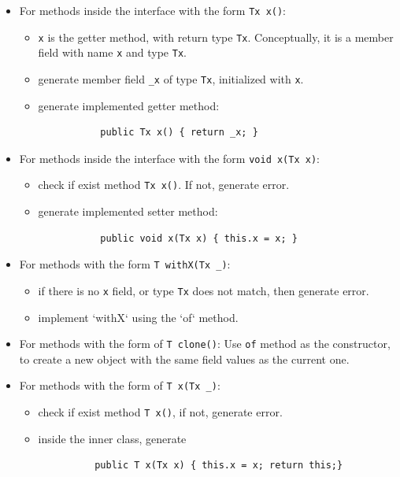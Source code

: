 \begin{itemize}
\item For methods inside the interface with the form \texttt{Tx x()}:
  \begin{itemize}
   \item \texttt{x} is the getter method, with return type
     \texttt{Tx}. Conceptually, it is a member field with name \texttt{x} and
     type \texttt{Tx}.
   \item generate member field \texttt{\_x} of type \texttt{Tx}, initialized
     with \texttt{x}.
   \item generate implemented getter method:
       \begin{lstlisting}
           public Tx x() { return _x; }
       \end{lstlisting}
   \end{itemize}

\item For methods inside the interface with the form \texttt{void x(Tx x)}:
  \begin{itemize}
    \item check if exist method \texttt{Tx x()}. If not, generate error.
    \item generate implemented setter method:
       \begin{lstlisting}
           public void x(Tx x) { this.x = x; }
       \end{lstlisting}
    \end{itemize}

\item For methods with the form \texttt{T withX(Tx \_)}:
  \begin{itemize}
  \item if there is no \texttt{x} field, or type \texttt{Tx} does not match,
    then generate error.
  \item implement `withX` using the `of` method.
  \end{itemize}

\item For methods with the form of \texttt{T clone()}: Use \texttt{of} method as
  the constructor, to create a new object with the same field values as the
  current one.

\item For methods with the form of \texttt{T x(Tx \_)}:
  \begin{itemize}
    \item check if exist method \texttt{T x()}, if not, generate error.
    \item inside the inner class, generate
      \begin{lstlisting}
          public T x(Tx x) { this.x = x; return this;}
      \end{lstlisting}
  \end{itemize}
\end{itemize}

